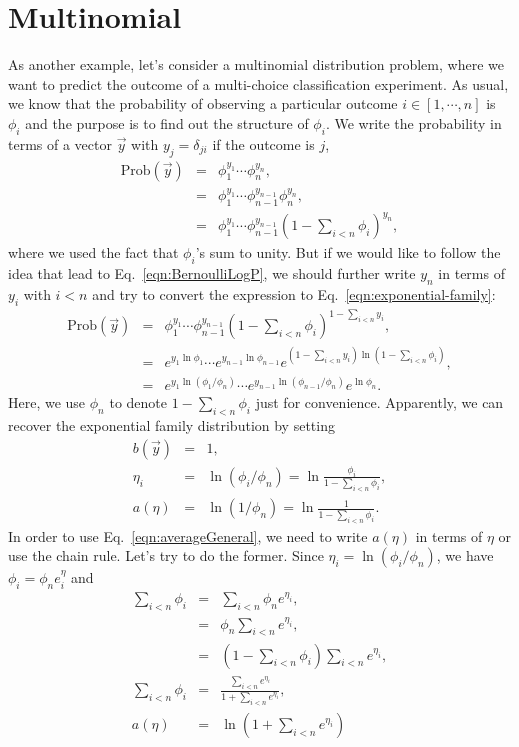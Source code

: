 \section{Multinomial}
As another example, let's consider a multinomial distribution problem, where we want to predict the outcome of a multi-choice classification experiment. As usual, we know that the probability of observing a particular outcome $i\in [1,\cdots,n]$ is $\phi_i$ and the purpose is to find out the structure of $\phi_i$. We write the probability in terms of a vector $\vec y$ with $y_j = \delta_{ji}$ if the outcome is $j$, 
\begin{eqnarray}
\text{Prob}(\vec y)&=&\phi_1^{y_1}\cdots\phi_n^{y_n},\\
		   &=&\phi_1^{y_1}\cdots\phi_{n-1}^{y_{n-1}}\phi_n^{y_n},\\
		   &=&\phi_1^{y_1}\cdots\phi_{n-1}^{y_{n-1}}(1-\sum_{i<n}\phi_i)^{y_n},
\end{eqnarray}
where we used the fact that $\phi_i$'s sum to unity. But if we would like to follow the idea that lead to Eq.~\ref{eqn:BernoulliLogP}, we should further write $y_n$ in terms of $y_i$ with $i<n$ and try to convert the expression to Eq.~\ref{eqn:exponential-family}:
\begin{eqnarray}
\text{Prob}(\vec y)&=&\phi_1^{y_1}\cdots\phi_{n-1}^{y_{n-1}}(1-\sum_{i<n}\phi_i)^{1-\sum_{i<n}y_i},\\
		   &=&e^{y_1\ln\phi_1}\cdots e^{y_{n-1}\ln\phi_{n-1}}e^{(1-\sum_{i<n}y_i)\ln(1-\sum_{i<n}\phi_i)},\\
		   &=&e^{y_1\ln(\phi_1/\phi_n)}\cdots e^{y_{n-1}\ln(\phi_{n-1}/\phi_n)}e^{\ln\phi_n}.
\end{eqnarray}
Here, we use $\phi_n$ to denote $1-\sum_{i<n}\phi_i$ just for convenience. Apparently, we can recover the exponential family distribution by setting
\begin{eqnarray}
b(\vec y) &=& 1,\\
\eta_i &=&\ln(\phi_i/\phi_n)=\ln\frac{\phi_i}{1-\sum_{i<n}\phi_i},\\
a(\eta) &=&\ln(1/\phi_n)= \ln\frac{1}{1-\sum_{i<n}\phi_i}.
\end{eqnarray}
In order to use Eq.~\ref{eqn:averageGeneral}, we need to write $a(\eta)$ in terms of $\eta$ or use the chain rule. Let's try to do the former. Since $\eta_i=\ln(\phi_i/\phi_n)$, we have $\phi_i=\phi_ne^\eta_i$ and
\begin{eqnarray}
\sum_{i<n}\phi_i &=& \sum_{i<n}\phi_ne^{\eta_i},\\
		 &=& \phi_n\sum_{i<n}e^{\eta_i},\\
		 &=& \left(1-\sum_{i<n}\phi_i\right)\sum_{i<n}e^{\eta_i},\\
\sum_{i<n}\phi_i&=&\frac{\sum_{i<n}e^{\eta_i}}{1+\sum_{i<n}e^{\eta_i}},\\
a(\eta)&=&\ln\left(1+\sum_{i<n}e^{\eta_i}\right)
\end{eqnarray}

